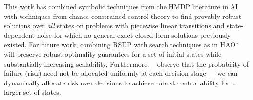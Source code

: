 \documentclass[letterpaper]{article}
\begin{document}
%
%

This work has combined symbolic techniques from
the HMDP literature in AI with techniques from chance-constrained
control theory to find provably robust solutions over \emph{all} states
on problems with piecewise linear transitions and state-dependent noise
for which no general exact closed-form solutions previously existed.
For future work, combining RSDP with
search techniques as in HAO*~\cite{hao09} will preserve 
robust optimality guarantees for a set of initial states while
substantially increasing scalability.  Furthermore,
~\cite{Ono:2008} observe that the probability of failure
(risk) need not be allocated uniformly at each decision stage --- we
can dynamically allocate risk over decisions to achieve
robust controllability for a larger set of states.
\end{document}
